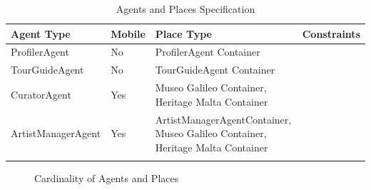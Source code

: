 \documentclass[paper=letter, fontsize=12pt]{article}
\begin{document}
\begin {table}[H]
\caption {Agents and Places Specification} \label{tab:placeTypes} 
\begin{center}
    \begin{tabular}{  p{4cm}  p{4cm}  p{4cm} p{4cm}}
\Xhline{4\arrayrulewidth}
    Agent Type & Mobile & Place Type & Constraints \\
 \hline
ProfilerAgent & No & ProfilerAgent Container & \\
TourGuideAgent & No & TourGuideAgent Container & \\
CuratorAgent & Yes & Museo Galileo Container, Heritage Malta Container & \\
ArtistManagerAgent & Yes & ArtistManagerAgentContainer, Museo Galileo Container, Heritage Malta Container &  \\

\Xhline{4\arrayrulewidth}
    \end{tabular}
\end{center}
\end{table}

\begin{figure}[H]
  \begin{center}
    \caption{Cardinality of Agents and Places}
    \label{fig:cardinality}
  \end{center}
\end{figure}
\end{document}
